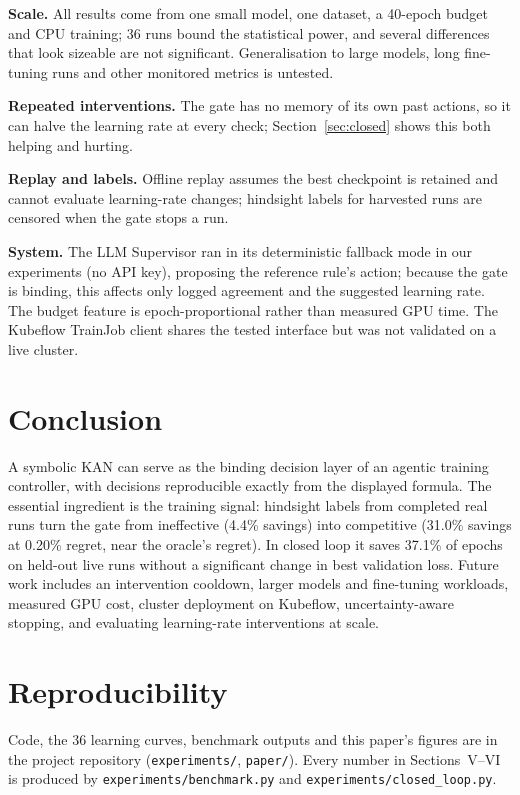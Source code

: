 \documentclass[conference]{IEEEtran}
\begin{document}
\textbf{Scale.} All results come from one small model, one dataset, a 40-epoch budget and CPU training; 36 runs bound the statistical power, and several differences that look sizeable are not significant. Generalisation to large models, long fine-tuning runs and other monitored metrics is untested.

\textbf{Repeated interventions.} The gate has no memory of its own past actions, so it can halve the learning rate at every check; Section~\ref{sec:closed} shows this both helping and hurting.

\textbf{Replay and labels.} Offline replay assumes the best checkpoint is retained and cannot evaluate learning-rate changes; hindsight labels for harvested runs are censored when the gate stops a run.

\textbf{System.} The LLM Supervisor ran in its deterministic fallback mode in our experiments (no API key), proposing the reference rule's action; because the gate is binding, this affects only logged agreement and the suggested learning rate. The budget feature is epoch-proportional rather than measured GPU time. The Kubeflow TrainJob client shares the tested interface but was not validated on a live cluster.

\section{Conclusion}
A symbolic KAN can serve as the binding decision layer of an agentic training controller, with decisions reproducible exactly from the displayed formula. The essential ingredient is the training signal: hindsight labels from completed real runs turn the gate from ineffective (4.4\% savings) into competitive (31.0\% savings at 0.20\% regret, near the oracle's regret). In closed loop it saves 37.1\% of epochs on held-out live runs without a significant change in best validation loss. Future work includes an intervention cooldown, larger models and fine-tuning workloads, measured GPU cost, cluster deployment on Kubeflow, uncertainty-aware stopping, and evaluating learning-rate interventions at scale.

\section*{Reproducibility}
Code, the 36 learning curves, benchmark outputs and this paper's figures are in the project repository (\texttt{experiments/}, \texttt{paper/}). Every number in Sections~V--VI is produced by \texttt{experiments/benchmark.py} and \texttt{experiments/closed\_loop.py}.



\end{document}
